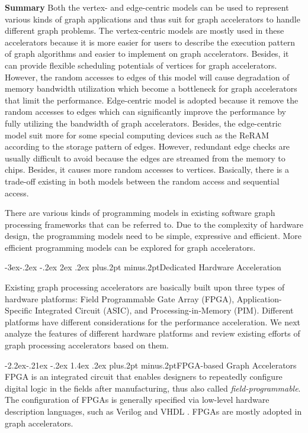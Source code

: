 \documentclass[twoside]{article}
\makeatletter
\def\subsection{\@startsection{subsection}{2}{\z@}%
 {-3ex\@plus -.2ex \@minus -.2ex}%
 {2ex \@plus.2ex}%
{\normalfont\normalsize\protect\baselineskip=12.5pt plus.2pt minus.2pt\bfseries}}
\def\subsubsection{\@startsection{subsubsection}{3}{\z@}%
 {-2.2ex\@plus -.21ex \@minus -.2ex}%
 {1.4ex \@plus.2ex}
{\normalfont\normalsize\protect\baselineskip=12pt plus.2pt minus.2pt\sl}}
\makeatother
\begin{document}
\begin{multicols}{2}
{\bf Summary}
Both the vertex- and edge-centric models can be used to represent various kinds of graph applications and thus suit for graph accelerators to handle different graph problems. The vertex-centric models are mostly used in these accelerators because it is more easier for users to describe the execution pattern of graph algorithms and easier to implement on graph accelerators. Besides, it can provide flexible scheduling potentials of vertices for graph accelerators. However, the random accesses to edges of this model will cause degradation of memory bandwidth utilization which become a bottleneck for graph accelerators that limit the performance. Edge-centric model is adopted because it remove the random accesses to edges which can significantly improve the performance by fully utilizing the bandwidth of graph accelerators. Besides, the edge-centric model suit more for some special computing devices such as the ReRAM \cite{Han2018reram} according to the storage pattern of edges. However, redundant edge checks are usually difficult to avoid because the edges are streamed from the memory to chips. Besides, it causes more random accesses to vertices. Basically, there is a trade-off existing in both models between the random access and sequential access. 

There are various kinds of programming models in existing software graph processing frameworks that can be referred to. Due to the complexity of hardware design, the programming models need to be simple, expressive and efficient. More efficient programming models can be explored for graph accelerators.


\subsection{Dedicated Hardware Acceleration}

Existing graph processing accelerators are basically built upon three types of hardware platforms: Field Programmable Gate Array (FPGA), Application-Specific Integrated Circuit (ASIC), and Processing-in-Memory (PIM). Different platforms have different considerations for the performance acceleration. We next analyze the features of different hardware platforms and review existing efforts of graph processing accelerators based on them.

\subsubsection{FPGA-based Graph Accelerators}
FPGA is an integrated circuit that enables designers to repeatedly configure digital logic in the fields after manufacturing, thus also called {\em field-programmable}. The configuration of FPGAs is generally specified via low-level hardware description languages, such as Verilog \cite{thomas2008verilog} and VHDL \cite{ashenden2010designervhdl}. FPGAs are mostly adopted in graph accelerators.


\end{multicols}
\end{document}

